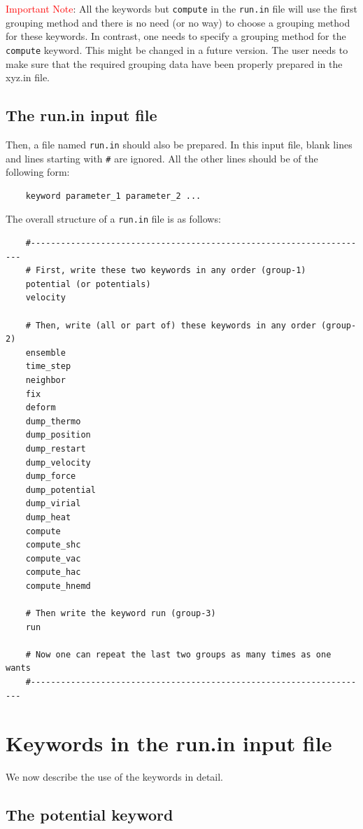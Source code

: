 \documentclass[12pt,a4paper]{report}
\begin{document}
\textcolor{red}{Important Note}: All the keywords but \verb"compute" in the \verb"run.in" file will use the first grouping method and there is no need (or no way) to choose a grouping method for these keywords. In contrast, one needs to specify a grouping method for the \verb"compute" keyword. This might be changed in a future version. The user needs to make sure that the required grouping data have been properly prepared in the xyz.in file.

\subsection{The run.in input file}

Then, a file named \verb"run.in" should also be prepared. In this input file, blank lines and lines starting with \verb"#" are ignored. All the other lines should be of the following form:
\begin{verbatim}
    keyword parameter_1 parameter_2 ...
\end{verbatim}
The overall structure of a \verb"run.in" file is as follows:
\begin{verbatim}
    #--------------------------------------------------------------------
    # First, write these two keywords in any order (group-1)
    potential (or potentials)
    velocity

    # Then, write (all or part of) these keywords in any order (group-2)
    ensemble
    time_step
    neighbor
    fix
    deform
    dump_thermo
    dump_position
    dump_restart
    dump_velocity
    dump_force
    dump_potential
    dump_virial
    dump_heat
    compute
    compute_shc
    compute_vac
    compute_hac
    compute_hnemd

    # Then write the keyword run (group-3)
    run

    # Now one can repeat the last two groups as many times as one wants
    #--------------------------------------------------------------------
\end{verbatim}


\section{Keywords in the run.in input file}
We now describe the use of the keywords in detail.

\subsection{The potential keyword}
\end{document}
